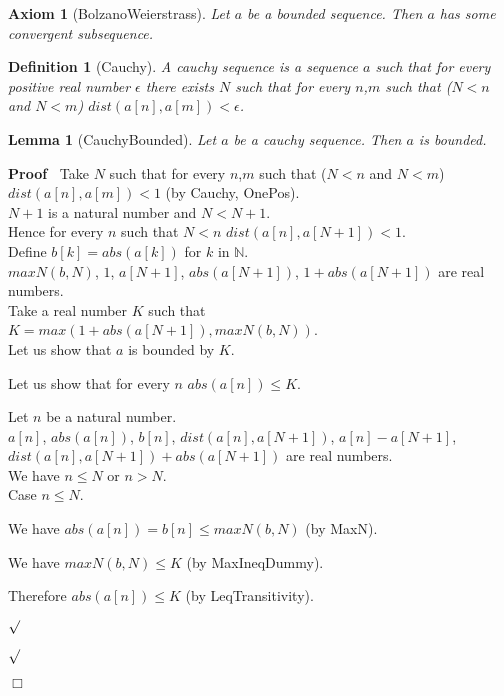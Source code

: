 \documentclass{article}
\newenvironment{forthel}{\begin{leftbar}}{\end{leftbar}}
\newenvironment{proof}{\noindent\textbf{Proof\ }}{\hspace*{\fill}$\Box$\medskip}
\newenvironment{subproof}{\begin{list}{}{}
		\item[\text{Proof}]}{\hfill $\surd$ \end{list}}
\newenvironment{case}{\begin{list}{}{}
		\item[]}{\end{list}}
\newtheorem{axiom}{Axiom}
\newtheorem{lemma}{Lemma}
\newtheorem{definition}{Definition}
\newcommand{\NN}{\mathbb{N}}
\begin{document}
\begin{forthel}
	\begin{axiom}[BolzanoWeierstrass]
		Let $a$ be a bounded sequence. Then $a$ has some convergent subsequence. 
	\end{axiom}
	
	\begin{definition}[Cauchy]
		A cauchy sequence is a sequence $a$ such that for every positive real number $\epsilon$ there exists $N$ such that
		for every $n$,$m$ such that ($N < n$ and $N < m$) $dist(a[n],a[m]) < \epsilon$.
	\end{definition}
	
	\begin{lemma}[CauchyBounded]
		Let $a$ be a cauchy sequence. Then $a$ is bounded.
	\end{lemma}
	\begin{proof}
		Take $N$ such that for every $n$,$m$ such that ($N < n$ and $N < m$) $dist(a[n],a[m]) < 1$ (by Cauchy, OnePos). \\
		$N + 1$ is a natural number and $N < N + 1$.\\
		Hence for every $n$ such that $N < n$ $dist(a[n],a[N + 1]) < 1$.\\
		Define $b[k] = abs(a[k])$ for $k$ in $\NN$.\\
		$maxN(b,N)$, $1$, $a[N + 1]$, $abs(a[N + 1])$, $1 + abs(a[N + 1])$ are real numbers.\\
		Take a real number $K$ such that $K = max(1 + abs(a[N + 1]), maxN(b,N))$.\\
		
		\noindent Let us show that $a$ is bounded by $K$.		
		\begin{subproof}
			Let us show that for every $n$ $abs(a[n]) \leq K$. 
			\begin{subproof}
				Let $n$ be a natural number.\\				
				$a[n]$, $abs(a[n])$, $b[n]$, $dist(a[n],a[N + 1])$, $a[n] - a[N + 1]$, $dist(a[n],a[N + 1]) + abs(a[N + 1])$ are real numbers.\\
				We have $n \leq N$ or $n > N$.\\
				Case $n \leq N$.
				\begin{case}
					We have $abs(a[n]) = b[n] \leq maxN(b,N)$ (by MaxN).
					
					We have $maxN(b,N) \leq K$ (by MaxIneqDummy).
					
					Therefore $abs(a[n]) \leq K$ (by LeqTransitivity).
					
				\end{case}	
				

\end{subproof}
\end{subproof}
\end{proof}
\end{forthel}
\end{document}
